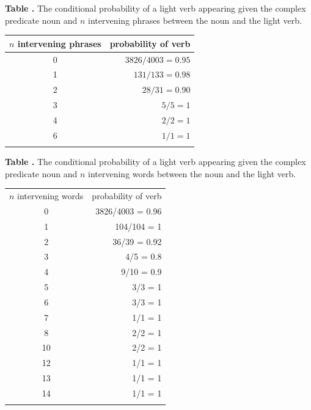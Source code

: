 \documentclass{frontiersSCNS}\usepackage{knitr} %
\begin{document}
\begin{table}[!htbp]
\textbf{\label{tab:corpuscountlightverb} Table . }{ The conditional probability of a light verb appearing given the complex predicate noun and $n$ intervening phrases between the noun and the light verb.}
\processtable{}
{\begin{tabular}{cr}\toprule
$n$ intervening phrases & probability of verb\\
\midrule
0                          &  $3826/4003 = 0.95$\\
1                          & $131/133 = 0.98$\\
2                          &  $28/31 = 0.90$\\
3                    & $5/5 = 1$\\
4                    & $2/2 = 1$\\
6                    &  $1/1 = 1$\\
\botrule
\end{tabular}}{}
\end{table}

\begin{table}[!htbp]
\textbf{\label{tab:corpuscountlightverb2} Table . }{ The conditional probability of a light verb appearing given the complex predicate noun and $n$ intervening words between the noun and the light verb.}
\processtable{}
{\begin{tabular}{cr}\toprule
$n$ intervening words & probability of verb\\
0 &   3826/4003 = 0.96\\
1 &   104/104 =         1\\
2  &  36/39      =    0.92\\
3  &  4/5           =   0.8\\
4  &  9/10          =    0.9\\
5  &  3/3            =  1\\
6  &  3/3            =  1\\
7  &  1/1            =  1\\
8  &  2/2             = 1\\
10 &   2/2           =   1\\
12  &  1/1            =  1\\
13   & 1/1            =  1\\
14   & 1/1            =  1\\
\botrule
\end{tabular}}{}
\end{table}
\end{document}
